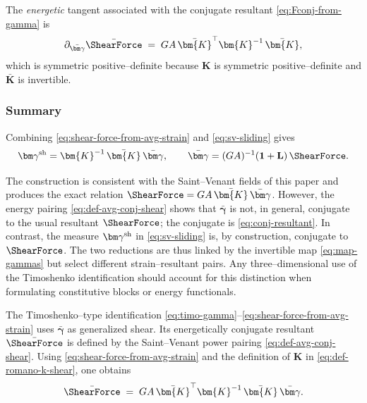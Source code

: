The \emph{energetic} tangent associated with the conjugate resultant \eqref{eq:Fconj-from-gamma} is
\begin{equation}
\label{eq:tangent-Fconj-gammabar}
\partial_{\bar{\bm\gamma}}\bar{\ShearForce} \;=\; GA\,\bar{\bm{K}}^{\top}\bm{K}^{-1}\,\bar{\bm{K}},
\end{equation}
which is symmetric positive–definite because $\bm{K}$ is symmetric positive–definite and $\bar{\bm{K}}$ is invertible.



\subsubsection{Summary}

Combining \eqref{eq:shear-force-from-avg-strain} and \eqref{eq:sv-sliding} gives
\begin{equation}
\label{eq:map-gammas}
\bm\gamma^{\rm sh}=\bm{K}^{-1}\,\bar{\bm{K}}\,\bar{\bm\gamma},\qquad
\bar{\bm\gamma}=(GA)^{-1}(\mathbf{1}+\mathbf L)\,\ShearForce.
\end{equation}

The construction is consistent with the Saint–Venant fields of this paper and produces the exact relation $\ShearForce=GA\,\bar{\bm{K}}\,\bar{\bm\gamma}$. 
However, the energy pairing \eqref{eq:def-avg-conj-shear} shows that $\bar{\bm\gamma}$ is not, in general, conjugate to the usual resultant $\ShearForce$; the conjugate is \eqref{eq:conj-resultant}. 
In contrast, the measure $\bm\gamma^{\rm sh}$ in \eqref{eq:sv-sliding} is, by construction, conjugate to $\ShearForce$. 
The two reductions are thus linked by the invertible map \eqref{eq:map-gammas} but select different strain–resultant pairs. Any three–dimensional use of the Timoshenko identification should account for this distinction when formulating constitutive blocks or energy functionals.


The Timoshenko–type identification \eqref{eq:timo-gamma}–\eqref{eq:shear-force-from-avg-strain} uses $\bar{\bm\gamma}$ as generalized shear. 
Its energetically conjugate resultant $\bar{\ShearForce}$ is defined by the Saint–Venant power pairing \eqref{eq:def-avg-conj-shear}. Using \eqref{eq:shear-force-from-avg-strain} and the definition of $\bm{K}$ in \eqref{eq:def-romano-k-shear}, one obtains
\begin{equation}
\label{eq:Fconj-from-gamma}
\bar{\ShearForce}
\;=\;GA\,\bar{\bm{K}}^{\top}\bm{K}^{-1}\,\bar{\bm{K}}\,\bar{\bm\gamma}.
\end{equation}

